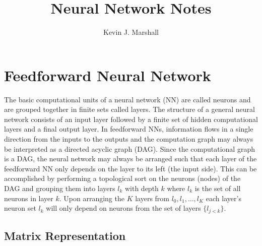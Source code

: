 \documentclass[12pt,notitlepage]{article}
\begin{document}
\title{Neural Network Notes}
\author{Kevin J. Marshall}
\maketitle

\section{Feedforward Neural Network}
\label{sec:ff-=nn}
The basic computational units of a neural network (NN) are called neurons
and are grouped together in finite sets called layers.  The structure of a
general neural network consists of an input layer followed by a finite
set of hidden computational layers and a final output layer.  In
feedforward NNs, information flows in a single direction from the
inputs to the outputs and the computation graph may always be
interpreted as a directed acyclic
graph (DAG).  Since the computational graph is a DAG, the neural
network may always be arranged such that each layer of the feedforward
NN only depends on  the layer to its left (the input side).  This can
be accomplished by performing a topological sort on the neurons
(nodes) of the DAG and
grouping them into layers $l_{k}$ with depth $k$ where $l_{k}$ is the
set of all neurons in layer $k$.  Upon arranging the $K$ layers from
$l_{0},l_{1},\dots,l_{K}$ each layer's neuron set $l_{k}$ will only depend
on neurons from the set of layers $\{l_{j<k}\}$.

\subsection{Matrix Representation}
\label{sec:matrix-rep}
\end{document}
